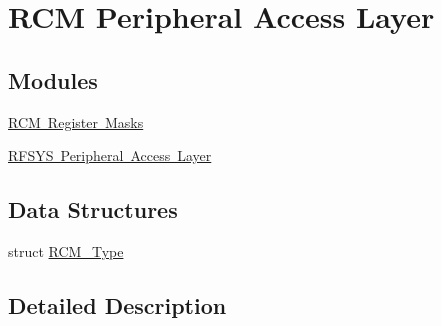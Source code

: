 \hypertarget{group___r_c_m___peripheral___access___layer}{}\section{R\+CM Peripheral Access Layer}
\label{group___r_c_m___peripheral___access___layer}
\subsection*{Modules}
\begin{DoxyCompactItemize}
\item 
\mbox{\hyperlink{group___r_c_m___register___masks}{R\+C\+M Register Masks}}
\item 
\mbox{\hyperlink{group___r_f_s_y_s___peripheral___access___layer}{R\+F\+S\+Y\+S Peripheral Access Layer}}
\end{DoxyCompactItemize}
\subsection*{Data Structures}
\begin{DoxyCompactItemize}
\item 
struct \mbox{\hyperlink{struct_r_c_m___type}{R\+C\+M\+\_\+\+Type}}
\end{DoxyCompactItemize}


\subsection{Detailed Description}
